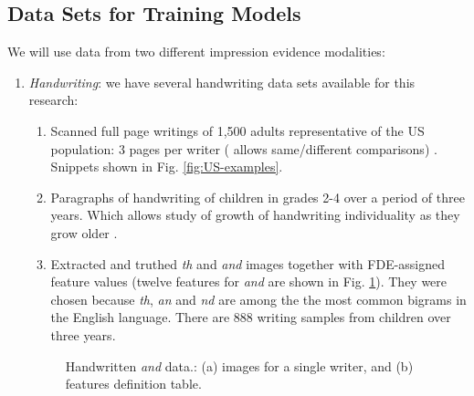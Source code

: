 \documentclass[11pt, doublespacing]{article}
\begin{document}
\subsection{Data Sets for Training Models}
We will use data from two different impression evidence modalities:
\begin{enumerate}
\item {\em Handwriting}: we have several handwriting data sets available for this research:
\begin{enumerate}
\item Scanned full page writings of 1,500 adults representative of the US population:  3 pages per writer ( allows same/different comparisons)  \cite{Srihari2002}. Snippets shown in Fig. \ref{fig:US-examples}.
\item Paragraphs of handwriting of children in grades 2-4 over a period of three years. Which allows study of growth of handwriting individuality as they grow older \cite{SrihariHanson2014}.
\item Extracted  and truthed {\em th} and {\em and} images together with FDE-assigned feature values (twelve features for {\em and} are shown in Fig. \ref{fig:and-features}). They were chosen because {\em th}, {\em an} and {\em nd} are among the the most common bigrams in the English language. There are 888 writing samples from children over three years.
\end{enumerate}

\begin{figure}[t!]
\centering
\caption{ Handwritten {\em and} data.: (a) images for a single writer, and  (b) features definition table.  }
\label{fig:and-features}
\end{figure}


\end{enumerate}
\end{document}
